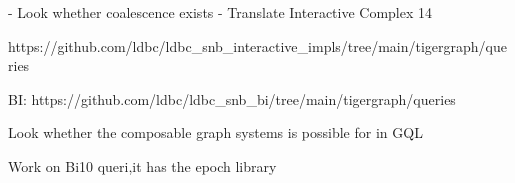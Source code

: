- Look whether coalescence exists
- Translate Interactive Complex 14

https://github.com/ldbc/ldbc_snb_interactive_impls/tree/main/tigergraph/queries

BI:
https://github.com/ldbc/ldbc_snb_bi/tree/main/tigergraph/queries


Look whether the composable graph systems is possible 
for in GQL

Work on Bi10 queri,it has the epoch library